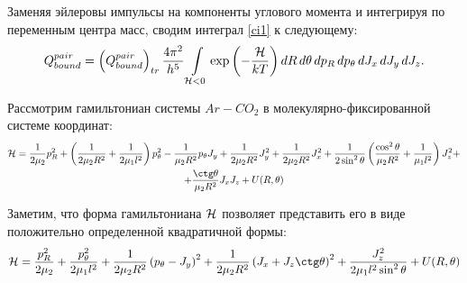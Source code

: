 Заменяя эйлеровы импульсы на компоненты углового момента и интегрируя по переменным центра масс, сводим интеграл \eqref{ci1} к следующему:
\vverh
\begin{gather}
	Q_{bound}^{pair} = \left( Q_{bound}^{pair} \right)_{tr} \frac{4 \pi^2}{h^5} \int\limits_{\mathcal{H} < 0} \exp \left( - \frac{\mathcal{H}}{kT} \right) d R \, d \theta \, d p_R \, d p_\theta \, d J_x \, d J_y \, d J_z. \notag
\end{gather}

Рассмотрим гамильтониан системы $Ar-CO_2$ в молекулярно-фиксированной системе координат:
\begin{gather}
	\mH = \frac{1}{2 \mu_2} p_R^2 + \lb \frac{1}{2 \mu_2 R^2} + \frac{1}{2 \mu_1 l^2} \rb p_\theta^2 - \frac{1}{\mu_2 R^2} p_\theta J_y + \frac{1}{2 \mu_2 R^2} J_y^2 + \frac{1}{2 \mu_2 R^2} J_x^2 + \frac{1}{2 \sin^2 \theta} \lb \frac{\cos^2 \theta}{\mu_2 R^2} + \frac{1}{\mu_1 l^2} \rb J_z^2 + \notag \\
+ \frac{\ctg \theta}{\mu_2 R^2} J_x J_z + U(R, \theta) \notag
\end{gather}

Заметим, что форма гамильтониана $\mathcal{H}$ позволяет представить его в виде положительно определенной квадратичной формы:
\begin{gather}
	\mH = \frac{p_R^2}{2 \mu_2} + \frac{p_\theta^2}{2 \mu_1 l^2} + \frac{1}{2 \mu_2 R^2} \lb p_\theta - J_y \rb^2 + \frac{1}{2 \mu_2 R^2} \lb J_x + J_z \ctg \theta \rb^2 + \frac{J_z^2}{2 \mu_1 l^2 \sin^2 \theta} + U(R, \theta) \notag
\end{gather}


